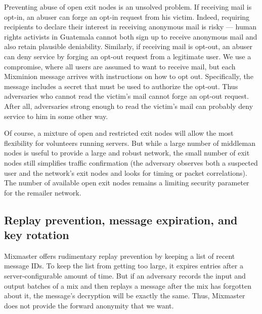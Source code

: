 \documentclass[11pt]{IEEEtran}
\begin{document}
Preventing abuse of open exit nodes is an unsolved problem. If
receiving mail is opt-in, an abuser can forge an opt-in request from
his victim. Indeed, requiring recipients to declare their interest
in receiving anonymous mail is risky --- human rights activists in
Guatemala cannot both sign up to receive anonymous mail and also retain
plausible deniability.%
Similarly, if receiving mail is opt-out, an abuser can deny service
by forging an opt-out request from a legitimate user. We use a compromise,
where all users are assumed to want to receive mail, but each Mixminion
message arrives with instructions on how to opt out. Specifically, the
message includes a secret that must be used to authorize the opt-out. Thus
adversaries who cannot read the victim's mail cannot forge an opt-out
request. After all, adversaries strong enough to read the victim's mail
can probably deny service to him in some other way.


Of course, a mixture of open and restricted exit nodes will allow the
most flexibility for volunteers running servers. But while a large number
of middleman nodes is useful to provide a large and robust network, the
small number of exit nodes still simplifies traffic confirmation
(the adversary observes both a suspected user and the
network's exit nodes and looks for timing or packet correlations). The
number of available open exit nodes remains a limiting security parameter
for the remailer network.

\subsection{Replay prevention, message expiration, and key rotation}

Mixmaster offers rudimentary replay prevention by keeping a list of recent
message IDs. To keep the list from getting too large, it expires entries
after a server-configurable amount of time. But if an adversary records
the input and output batches of a mix and then replays a message after
the mix has forgotten about it, the message's decryption will be exactly
the same. Thus, Mixmaster does not provide the forward anonymity that we want.
\end{document}

